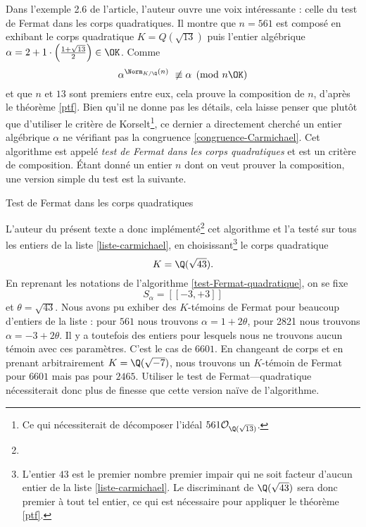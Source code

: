 Dans l'exemple 2.6 de l'article, l'auteur ouvre une voix intéressante : celle du test de Fermat dans les corps quadratiques. Il montre que $n = 561$ est composé en exhibant le corps quadratique $K = Q(\sqrt{13})$ puis l'entier algébrique $\alpha = 2 + 1\cdot \left(\frac{1 + \sqrt{13}}{2}\right) \in \OK$. Comme $$\alpha^{\Norm_{K/\Q}(n)} \not \equiv \alpha \pmod{n\OK}$$ et que $n$ et $13$ sont premiers entre eux, cela prouve la composition de $n$, d'après le théorème \ref{ptf}. Bien qu'il ne donne pas les détails, cela laisse penser que plutôt que d'utiliser le critère de Korselt\footnote{Ce qui nécessiterait de décomposer l'idéal $561\mathcal{O}_{\Q(\sqrt{13})}$.}, ce dernier a directement cherché un entier algébrique $\alpha$ ne vérifiant pas la congruence \ref{congruence-Carmichael}. Cet algorithme est appelé \emph{test de Fermat dans les corps quadratiques} et est un critère de composition. Étant donné un entier $n$ dont on veut prouver la composition, une version simple du test est la suivante.

\vspace{1em}
\begin{algorithm}[H]\label{test-Fermat-quadratique}\label{algo-1}
\caption{Test de Fermat dans les corps quadratiques}
\end{algorithm}
\vspace{1em}

L'auteur du présent texte a donc implémenté\footnote{} cet algorithme et l'a testé sur tous les entiers de la liste \ref{liste-carmichael}, en choisissant\footnote{L'entier $43$ est le premier nombre premier impair qui ne soit facteur d'aucun entier de la liste \ref{liste-carmichael}. Le discriminant de $\Q(\sqrt{43})$ sera donc premier à tout tel entier, ce qui est nécessaire pour appliquer le théorème \ref{ptf}.} le corps quadratique \[K = \Q(\sqrt{43}).\] En reprenant les notations de l'algorithme \ref{test-Fermat-quadratique}, on se fixe $$ S_\alpha = [\![-3, +3]\!]$$ et $\theta = \sqrt{43}$. Nous avons pu exhiber des $K$-témoins de Fermat pour beaucoup d'entiers de la liste : pour $561$ nous trouvons $\alpha = 1 + 2\theta$, pour 2821 nous trouvons $\alpha = -3 + 2\theta$. Il y a toutefois des entiers pour lesquels nous ne trouvons aucun témoin avec ces paramètres. C'est le cas de $6601$. En changeant de corps et en prenant arbitrairement $K = \Q(\sqrt{-7})$, nous trouvons un $K$-témoin de Fermat pour $6601$ mais pas pour $2465$. Utiliser le test de Fermat—quadratique nécessiterait donc plus de finesse que cette version naïve de l'algorithme.  \\

